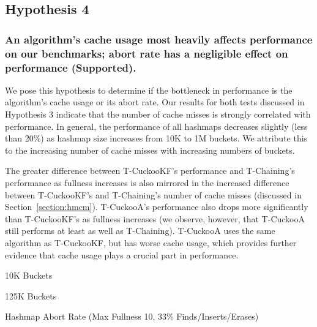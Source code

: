 \vspace{12pt}
\noindent{}


\subsection{Hypothesis 4}
\subsubsection{An algorithm's cache usage most heavily affects performance on our benchmarks; abort rate has a negligible effect on performance (Supported).}

    We pose this hypothesis to determine if the bottleneck in performance is the algorithm's cache usage or its abort rate. 
Our results for both tests discussed in Hypothesis 3 indicate that the number of cache misses is strongly correlated with performance. In general, the performance of all hashmaps decreases slightly (less than 20\%) as hashmap size increases from 10K to 1M buckets. We attribute this to the increasing number of cache misses with increasing numbers of buckets.

The greater difference between T-CuckooKF's performance and T-Chaining's performance as fullness increases is also mirrored in the increased difference between T-CuckooKF's and T-Chaining's number of cache misses (discussed in Section~\ref{section:hmcm}). T-CuckooA's performance also drops more significantly than T-CuckooKF's as fullness increases (we observe, however, that T-CuckooA still performs at least as well as T-Chaining). T-CuckooA uses the same algorithm as T-CuckooKF, but has worse cache usage, which provides further evidence that cache usage plays a crucial part in performance. 

    \begin{table}[t]
    \centering
	\singlespace
        \begin{minipage}{\textwidth}
            \centering
        
        \caption*{10K Buckets}
            \vspace{12pt}
        \end{minipage}
        \begin{minipage}{\textwidth}
            \centering
        
        \caption*{125K Buckets}
        \end{minipage}
        \caption{Hashmap Abort Rate (Max Fullness 10, 33\% Finds/Inserts/Erases)}
		\label{tab:hm_aborts}
    \end{table}

